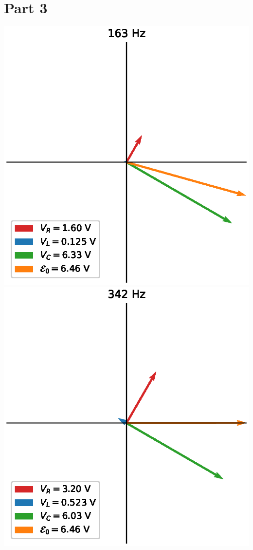 \documentclass[12pt]{iopart} %
\begin{document}
\section*{Part 3}

\includegraphics{media/part_3_163_hz.eps}
\includegraphics{media/part_3_342_hz.eps}
\end{document}
